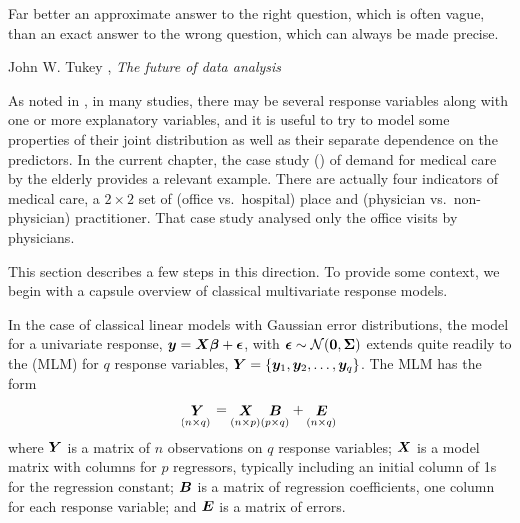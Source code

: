 \documentclass[11pt]{book}\usepackage[]{graphicx}\usepackage[]{color}
\begin{document}
\epigraph{Far better an approximate answer to the right question,
which is often vague, than an exact answer to the wrong question,
which can always be made precise.}{John W. Tukey \citeyearpar{Tukey:1962}, \emph{The future of data analysis}}


As noted in , in many studies, there may be
several response variables along with one or more explanatory variables,
and it is useful to try to model some properties
of their joint distribution as well as their separate dependence on
the predictors.
In the current chapter, the case study ()
of demand for medical care by the elderly provides a relevant example.
There are actually four indicators of medical care, a $2 \times 2$ set of
(office vs.\ hospital) place and (physician vs.\ non-physician) practitioner.
That case study analysed only the office visits by physicians.

This section describes a few steps in this direction.  To provide some context,
we begin with a capsule overview of classical multivariate response models.

In the case of classical linear models with Gaussian error distributions, the
model for a univariate response, $\bm{y} = \bm{X} \bm{\beta} + \bm{\epsilon}$,
with
$\bm{\epsilon} \sim \mathcal{N} (\bm{0}, \bm{\Sigma})$
extends quite readily to the  (MLM) for $q$ response variables,
$\bm{Y} = \{ \bm{y}_1, \bm{y}_2, \dots , \bm{y}_q \}$.  The MLM has the form
\begin{equation}\label{eq:mlm}
\mathord{\mathop{\bm{Y}}\limits_{(n\times q)}} = \mathord{\mathop{\bm{X}}\limits_{(n\times p)}} \mathord{\mathop{\bm{B}}\limits_{(p\times q)}} +
\mathord{\mathop{\bm{E}}\limits_{(n\times q)}}
\end{equation}
where $\bm{Y}$ is a matrix of $n$ observations on $q$ response variables; $\bm{X}$ is a model matrix with columns for $p$ regressors, typically including an initial column of 1s for the regression constant;
$\bm{B}$ is a matrix of regression coefficients, one column for each response variable; and $\bm{E}$ is a matrix of errors.
\end{document}
